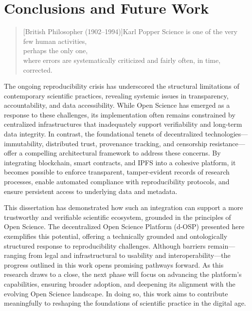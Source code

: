 \documentclass[final]{rc-book-2.14}
\begin{document}
\chapter{Conclusions and Future Work}
\label{chp:conclusions}

\begin{quotation}[British Philosopher (1902–1994)]{Karl Popper}
    Science is one of the very few human activities, \\
    perhaps the only one, \\
    where errors are systematically criticized and fairly often, in time, corrected.
\end{quotation}

\drop The ongoing reproducibility crisis has underscored the structural limitations of contemporary scientific practices, revealing systemic issues in transparency, accountability, and data accessibility. While Open Science has emerged as a response to these challenges, its implementation often remains constrained by centralized infrastructures that inadequately support verifiability and long-term data integrity. In contrast, the foundational tenets of decentralized technologies—immutability, distributed trust, provenance tracking, and censorship resistance—offer a compelling architectural framework to address these concerns. By integrating blockchain, smart contracts, and IPFS into a cohesive platform, it becomes possible to enforce transparent, tamper-evident records of research processes, enable automated compliance with reproducibility protocols, and ensure persistent access to underlying data and metadata.

This dissertation has demonstrated how such an integration can support a more trustworthy and verifiable scientific ecosystem, grounded in the principles of Open Science. The decentralized Open Science Platform (d-OSP) presented here exemplifies this potential, offering a technically grounded and ontologically structured response to reproducibility challenges. Although barriers remain—ranging from legal and infrastructural to usability and interoperability—the progress outlined in this work opens promising pathways forward. As this research draws to a close, the next phase will focus on advancing the platform's capabilities, ensuring broader adoption, and deepening its alignment with the evolving Open Science landscape. In doing so, this work aims to contribute meaningfully to reshaping the foundations of scientific practice in the digital age.
\end{document}
